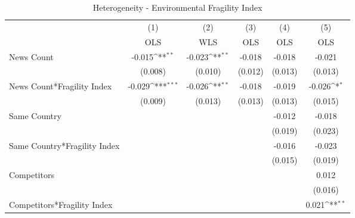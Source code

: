 \begin{table}[htbp]\centering
\def\sym#1{\ifmmode^{#1}\else\(^{#1}\)\fi}
\caption{Heterogeneity - Environmental Fragility Index}
\begin{tabular}{l*{5}{c}}
\toprule
                    &\multicolumn{1}{c}{(1)}&\multicolumn{1}{c}{(2)}&\multicolumn{1}{c}{(3)}&\multicolumn{1}{c}{(4)}&\multicolumn{1}{c}{(5)}\\
                    &\multicolumn{1}{c}{OLS}&\multicolumn{1}{c}{WLS}&\multicolumn{1}{c}{OLS}&\multicolumn{1}{c}{OLS}&\multicolumn{1}{c}{OLS}\\
\midrule
News Count          &      -0.015\sym{**} &      -0.023\sym{**} &      -0.018         &      -0.018         &      -0.021         \\
                    &     (0.008)         &     (0.010)         &     (0.012)         &     (0.013)         &     (0.013)         \\
\addlinespace
News Count*Fragility Index&      -0.029\sym{***}&      -0.026\sym{**} &      -0.018         &      -0.019         &      -0.026\sym{*}  \\
                    &     (0.009)         &     (0.013)         &     (0.013)         &     (0.013)         &     (0.015)         \\
\addlinespace
Same Country        &                     &                     &                     &      -0.012         &      -0.018         \\
                    &                     &                     &                     &     (0.019)         &     (0.023)         \\
\addlinespace
Same Country*Fragility Index&                     &                     &                     &      -0.016         &      -0.023         \\
                    &                     &                     &                     &     (0.015)         &     (0.019)         \\
\addlinespace
Competitors         &                     &                     &                     &                     &       0.012         \\
                    &                     &                     &                     &                     &     (0.016)         \\
\addlinespace
Competitors*Fragility Index&                     &                     &                     &                     &       0.021\sym{**} \\

\end{tabular}
\end{table}
